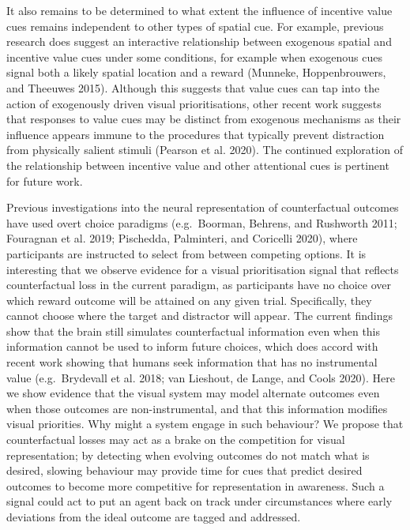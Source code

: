 \documentclass[11pt,halfline,a4paper,]{ouparticle}
\begin{document}
It also remains to be determined to what extent the influence of incentive value cues remains independent to other types of spatial cue. For example, previous research does suggest an interactive relationship between exogenous spatial and incentive value cues under some conditions, for example when exogenous cues signal both a likely spatial location and a reward (Munneke, Hoppenbrouwers, and Theeuwes 2015). Although this suggests that value cues can tap into the action of exogenously driven visual prioritisations, other recent work suggests that responses to value cues may be distinct from exogenous mechanisms as their influence appears immune to the procedures that typically prevent distraction from physically salient stimuli (Pearson et al. 2020). The continued exploration of the relationship between incentive value and other attentional cues is pertinent for future work.

Previous investigations into the neural representation of counterfactual outcomes have used overt choice paradigms (e.g.~Boorman, Behrens, and Rushworth 2011; Fouragnan et al. 2019; Pischedda, Palminteri, and Coricelli 2020), where participants are instructed to select from between competing options. It is interesting that we observe evidence for a visual prioritisation signal that reflects counterfactual loss in the current paradigm, as participants have no choice over which reward outcome will be attained on any given trial. Specifically, they cannot choose where the target and distractor will appear. The current findings show that the brain still simulates counterfactual information even when this information cannot be used to inform future choices, which does accord with recent work showing that humans seek information that has no instrumental value (e.g.~Brydevall et al. 2018; van Lieshout, de Lange, and Cools 2020). Here we show evidence that the visual system may model alternate outcomes even when those outcomes are non-instrumental, and that this information modifies visual priorities. Why might a system engage in such behaviour? We propose that counterfactual losses may act as a brake on the competition for visual representation; by detecting when evolving outcomes do not match what is desired, slowing behaviour may provide time for cues that predict desired outcomes to become more competitive for representation in awareness. Such a signal could act to put an agent back on track under circumstances where early deviations from the ideal outcome are tagged and addressed.
\end{document}
